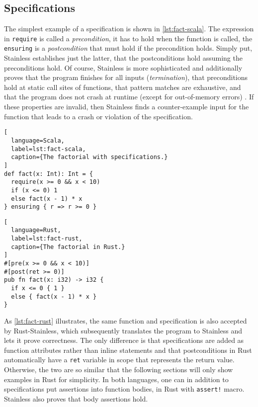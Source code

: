 \subsection{Specifications}

The simplest example of a specification is shown in \autoref{lst:fact-scala}.
The expression in \lstinline!require! is called a \emph{precondition}, it has to
hold when the function is called, the \lstinline!ensuring! is a
\emph{postcondition} that must hold if the precondition holds. Simply put,
Stainless establishes just the latter, that the postconditions hold assuming the
preconditions hold. Of course, Stainless is more sophisticated and additionally
proves that the program finishes for all inputs (\emph{termination}), that
preconditions hold at static call sites of functions, that pattern matches are
exhaustive, and that the program does not crash at runtime (except for
out-of-memory errors) \cite{stainless-doc}. If these properties are invalid,
then Stainless finds a counter-example input for the function that leads to a
crash or violation of the specification.

\noindent\begin{minipage}[t]{.47\textwidth}
\begin{lstlisting}[
  language=Scala,
  label=lst:fact-scala,
  caption={The factorial with specifications.}
]
def fact(x: Int): Int = {
  require(x >= 0 && x < 10)
  if (x <= 0) 1
  else fact(x - 1) * x
} ensuring { r => r >= 0 }
\end{lstlisting}
\end{minipage}\hfill
\begin{minipage}[t]{.47\textwidth}
\begin{lstlisting}[
  language=Rust,
  label=lst:fact-rust,
  caption={The factorial in Rust.}
]
#[pre(x >= 0 && x < 10)]
#[post(ret >= 0)]
pub fn fact(x: i32) -> i32 {
  if x <= 0 { 1 }
  else { fact(x - 1) * x }
}
\end{lstlisting}
\end{minipage}

As \autoref{lst:fact-rust} illustrates, the same function and specification is
also accepted by Rust-Stainless, which subsequently translates the program to
Stainless and lets it prove correctness. The only difference is that
specifications are added as function attributes rather than inline statements
and that postconditions in Rust automatically have a \lstinline!ret! variable in
scope that represents the return value. Otherwise, the two are so similar that
the following sections will only show examples in Rust for simplicity. In both
languages, one can in addition to specifications put assertions into function
bodies, in Rust with \lstinline"assert!" macro. Stainless also proves that body
assertions hold.

